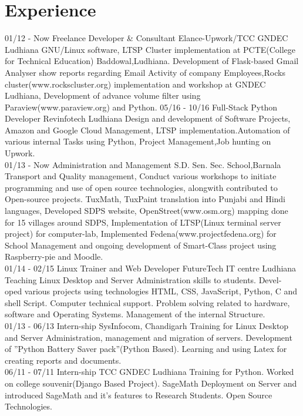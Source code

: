 \documentclass[]{friggeri-cv}
\begin{document}
\section{Experience}
\begin{entrylist}
  \entry
    {01/12 - Now }
    {Freelance Developer \& Consultant}
    {Elance-Upwork/TCC GNDEC Ludhiana}
    {GNU/Linux software, LTSP Cluster implementation at PCTE(College for Technical Education) Baddowal,Ludhiana. Development of Flask-based Gmail Analyser show reports regarding Email Activity of company Employees,Rocks cluster(www.rockscluster.org) implementation and workshop at GNDEC Ludhiana, Development of advance volume filter using Paraview(www.paraview.org) and Python.}
  \entry
    {05/16 - 10/16}
    {Full-Stack Python Developer}
    {Revinfotech Ludhiana}
    {Design and development of Software Projects, Amazon and Google Cloud Management, LTSP implementation.Automation of various internal Tasks using Python, Project Management,Job hunting on Upwork.\\}
  \entry
    {01/13 - Now }
    {Administration and Management}
    {S.D. Sen. Sec. School,Barnala}
    {Transport and Quality management, Conduct various workshops to initiate programming and use of open source technologies, alongwith contributed to
Open-source projects. TuxMath, TuxPaint translation into Punjabi and Hindi languages,
Developed SDPS website, OpenStreet(www.osm.org) mapping done for 15
villages around SDPS, Implementation of LTSP(Linux terminal server project)
for computer-lab, Implemented Fedena(www.projectfedena.org) for School Management and ongoing development of Smart-Class project using
Raspberry-pie and Moodle.\\}
    \entry
    {01/14 - 02/15}
    {Linux Trainer and Web Developer}
    {FutureTech IT centre Ludhiana}
    {Teaching Linux Desktop and Server Administration skills to students. Devel-
oped various projects using technologies HTML, CSS, JavaScript, Python,
C and shell Script. Computer technical support. Problem solving related to hardware, software and Operating Systems. Management of the internal Structure.\\}
    \entry
    {01/13 - 06/13}
    {Intern-ship}
    {SysInfocom, Chandigarh}
    {Training for Linux Desktop and Server Administration, management and migration of servers. Development of ”Python Battery Saver pack”(Python
Based). Learning and using Latex for creating reports and documents.\\}
    \entry
    {06/11 - 07/11}
    {Intern-ship}
    {TCC GNDEC Ludhiana}
    {Training for Python. Worked on college souvenir(Django Based Project).
SageMath Deployment on Server and introduced SageMath and it’s features
to Research Students. Open Source Technologies.\\}
\\
\\
\\
\end{entrylist}
\end{document}
